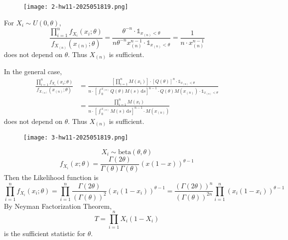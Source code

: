 \begin{exercise}
\begin{figure}[H]
\centering
\texttt{[image: 2-hw11-2025051819.png]}
\label{}
\end{figure}
\end{exercise}
For $X_i\sim U(0,\theta)$,
\[
\frac{\prod_{i=1}^{n} f_{X_i}(x_i;\theta)}{f_{X_{(n)}}(x_{(n)};\theta)}=\frac{\theta^{-n}\cdot \mathbb{1}_{x_{(n)}<\theta}}{n\theta^{-n}x_{(n)}^{n-1}\cdot \mathbb{1}_{x_{(n)}<\theta}}=\frac{1}{n\cdot x^{n-1}_{(n)}}
\]
does not depend on $\theta$. Thus $X_{(n)}$ is sufficient.

In the general case,
\[
\begin{aligned}
\frac{\prod_{i=1}^{n} f_{X_i}(x_i;\theta)}{f_{X_{(n)}}(x_{(n)};\theta)} & =\frac{\left[ \prod_{i=1}^{n} M(x_i) \right]\cdot[Q(\theta)]^{n}\cdot \mathbb{1}_{x_{(n)}<\theta}}{n\cdot\left[ \int_{0}^{x_{(n)}} Q(\theta)M(s) \, \mathrm{d}s  \right]^{n-1}\cdot Q(\theta) M(x_{(n)})\cdot \mathbb{1}_{x_{(n)}<\theta}} \\
 & =\frac{\prod_{i=1}^{n} M(x_i)}{n\cdot\left[ \int_{0}^{x_{(n)}} M(s) \, \mathrm{d}s  \right]^{n-1}\cdot M(x_{(n)})}
\end{aligned}
\]
does not depend on $\theta$. Thus $X_{(n)}$ is sufficient.

\begin{exercise}
\begin{figure}[H]
\centering
\texttt{[image: 3-hw11-2025051819.png]}
\label{}
\end{figure}
\end{exercise}
\[
X_i\sim \text{beta}(\theta,\theta)
\]
\[
f_{X_i}(x;\theta)=\frac{\Gamma(2\theta)}{\Gamma(\theta)\Gamma(\theta)}(x(1-x))^{\theta-1}
\]
Then the Likelihood function is
\[
\prod_{i=1}^{n} f_{X_i}(x_i;\theta)=\prod_{i=1}^{n} \frac{\Gamma(2\theta)}{(\Gamma(\theta))^2}(x_i(1-x_i))^{\theta-1}=\frac{(\Gamma(2\theta))^{n}}{(\Gamma(\theta))^{2n}}\prod_{i=1}^{n} (x_i(1-x_i))^{\theta-1}
\]
By Neyman Factorization Theorem,
\[
T=\prod_{i=1}^{n} X_i(1-X_i)
\]
is the sufficient statistic for $\theta$.

